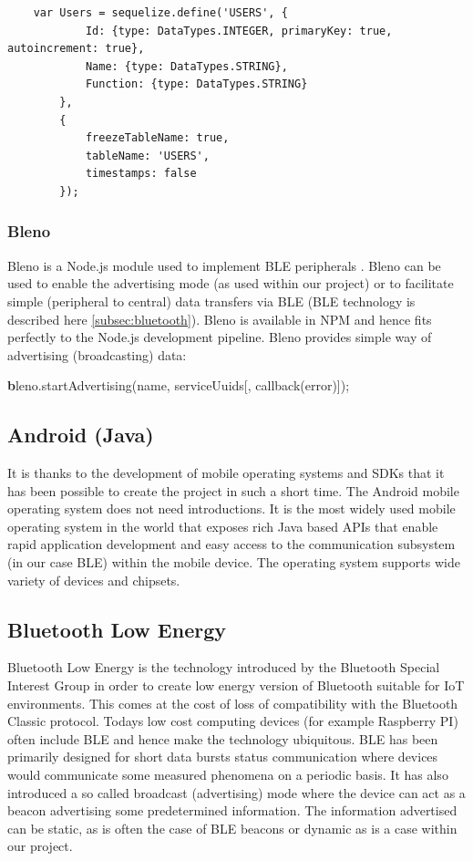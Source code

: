 \smallskip
\begin{lstlisting}
    var Users = sequelize.define('USERS', {
            Id: {type: DataTypes.INTEGER, primaryKey: true, autoincrement: true},
            Name: {type: DataTypes.STRING},
            Function: {type: DataTypes.STRING}
        },
        {
            freezeTableName: true,
            tableName: 'USERS',
            timestamps: false
        });
\end{lstlisting}
\smallskip

\subsubsection{Bleno}
\label{subsubsec:bleno}

Bleno is a Node.js module used to implement BLE peripherals \citep{bleno}. Bleno can be used to enable the advertising mode (as used within our project) or to facilitate simple (peripheral to central) data transfers via BLE (BLE technology is described here \autoref{subsec:bluetooth}). Bleno is available in NPM and hence fits perfectly to the Node.js development pipeline. Bleno provides simple way of advertising (broadcasting) data: \newline

\smallskip
{\textbf bleno.startAdvertising(name, serviceUuids[, callback(error)]);}
\newline
\smallskip

\subsection{Android (Java)}
\label{subsec:android}
It is thanks to the development of mobile operating systems and SDKs that it has been possible to create the project in such a short time. The Android mobile operating system \citep{android} does not need introductions. It is the most widely used mobile operating system in the world that exposes rich Java based APIs that enable rapid application development and easy access to the communication subsystem (in our case BLE) within the mobile device. The operating system supports wide variety of devices and chipsets.


\subsection{Bluetooth Low Energy}
\label{subsec:bluetooth}
Bluetooth Low Energy is the technology introduced by the Bluetooth Special Interest Group \citep{bluetooth} in order to create low energy version of Bluetooth suitable for IoT environments. This comes at the cost of loss of compatibility with the Bluetooth Classic protocol. Todays low cost computing devices (for example Raspberry PI) often include BLE and hence make the technology ubiquitous. BLE has been primarily designed for short data bursts status communication where devices would communicate some measured phenomena on a periodic basis. It has also introduced a so called broadcast (advertising) mode where the device can act as a beacon advertising some predetermined information. The information advertised can be static, as is often the case of BLE beacons \citep{ferguson2017bluetooth} or dynamic as is a case within our project. 

